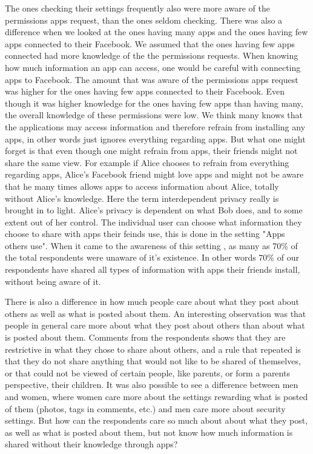 The ones checking their settings frequently also were more aware of the permissions apps request, than the ones seldom checking. There was also a difference when we looked at the ones having many apps and the ones having few apps connected to their Facebook. We assumed that the ones having few apps connected had more knowledge of the the permissions requests. When knowing how much information an app can access, one would be careful with connecting apps to Facebook. The amount that was aware of the permissions apps request was higher for the ones having few apps connected to their Facebook. Even though it was higher knowledge for the ones having few apps than having many, the overall knowledge of these permissions were low. We think many knows that the applications may access information and therefore refrain from installing any apps, in other words just ignores everything regarding apps. But what one might forget is that even though one might refrain from apps, their friends might not share the same view. For example if Alice chooses to refrain from everything regarding apps, Alice's Facebook friend might love apps and might not be aware that he many times allows apps to access information about Alice, totally without Alice's knowledge. Here the term interdependent privacy really is brought in to light. Alice's privacy is dependent on what Bob does, and to some extent out of her control.   
The individual user can choose what information they choose to share with apps their feinds use, this is done in the setting "Apps others use". When it came to the awareness of this setting , as many as 70\% of the total respondents were unaware of it's existence. In other words 70\% of our respondents have shared all types of information with apps their friends install, without being aware of it.

There is also a difference in how much people care about what they post about others as well as what is posted about them. An interesting observation was that people in general care more about what they post about others than about what is posted about them. Comments from the respondents shows that they are restrictive in what they chose to share about others, and a rule that repeated is that they do not share anything that would not like to be shared of themselves, or that could not be viewed of certain people, like parents, or form a parents perspective, their children. It was also possible to see a difference between men and women, where women care more about the settings rewarding what is posted of them (photos, tags in comments, etc.) and men care more about security settings. 
But how can the respondents care so much about about what they post, as well as what is posted about them, but not know how much information is shared without their knowledge through apps? 


